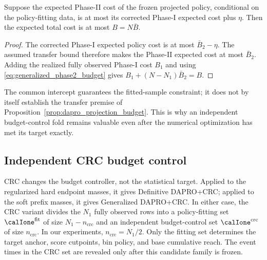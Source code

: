 \begin{proposition}
\label{prop:dapro_projection_budget}
Suppose the expected Phase-II cost of the frozen projected policy, conditional
on the policy-fitting data, is at most its corrected Phase-I expected cost
plus $\eta$.  Then the expected total cost is at most $B=N\bar B$.
\end{proposition}

\begin{proof}
The corrected Phase-I expected policy cost is at most $\bar B_2-\eta$.
The assumed transfer bound therefore makes the Phase-II expected cost at most
$\bar B_2$.  Adding the realized fully observed Phase-I cost $B_1$ and using
\eqref{eq:generalized_phase2_budget} gives
$B_1+(N-N_1)\bar B_2=B$.
\end{proof}

The common intercept guarantees the fitted-sample constraint; it does not by
itself establish the transfer premise of
Proposition~\ref{prop:dapro_projection_budget}.  This is why an independent
budget-control fold remains valuable even after the numerical optimization
has met its target exactly.

\subsection{Independent CRC budget control}
\label{sec:generalized_dapro_crc}

CRC changes the budget controller, not the statistical target.  Applied to
the regularized hard endpoint masses, it gives Definitive DAPRO+CRC; applied
to the soft prefix masses, it gives Generalized DAPRO+CRC.  In either case,
the CRC variant divides the $N_1$ fully observed rows into a policy-fitting
set $\calIone^{\mathrm{fit}}$ of size $N_1-n_{\mathrm{crc}}$ and an
independent budget-control set $\calIone^{\mathrm{crc}}$ of size
$n_{\mathrm{crc}}$.  In our experiments,
$n_{\mathrm{crc}}=N_1/2$.  Only the fitting set determines the target anchor,
score cutpoints, bin policy, and base cumulative reach.  The event times in
the CRC set are revealed only after this candidate family is frozen.

